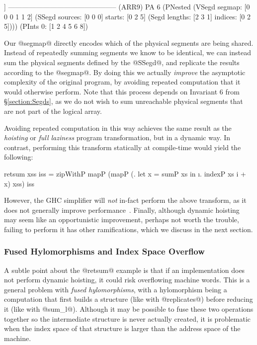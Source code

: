 \eject
\begin{small}
\begin{code}
      [[1 2] [1 2] [1 2] [4 5 6] [4 5 6] [8]]
 ----------------------------------------------- (ARR9)
   PA 6 (PNested 
    (VSegd  segmap: [0 0 0 1 1 2]
    (SSegd sources: [0 0 0]    starts: [0 2 5]
    (Segd  lengths: [2 3 1]   indices: [0 2 5])))
    (PInts 0: [1 2 4 5 6 8])
\end{code}
\end{small}

Our @segmap@ directly encodes which of the physical segments are being shared. Instead of repeatedly summing segments we know to be identical, we can instead sum the physical segments defined by the @SSegd@, and replicate the results according to the @segmap@. By doing this we actually \emph{improve} the asymptotic complexity of the original program, by avoiding repeated computation that it would otherwise perform. Note that this process depends on Invariant 6 from \S\ref{section:Segds}, as we do not wish to sum unreachable physical segments that are not part of the logical array.

Avoiding repeated computation in this way achieves the same result as the \emph{hoisting} or \emph{full laziness} program transformation, but in a dynamic way. In contrast, performing this transform statically at compile-time would yield the following: 
%
\begin{small}
\begin{code}
 retsum xss iss 
   = zipWithP mapP
             (mapP (\xs. let x = sumP xs 
                         in \i. indexP xs i + x) xss) iss
\end{code}
\end{small}
%
However, the GHC simplifier will \emph{not} in-fact perform the above transform, as it does not generally improve performance~\cite{PeytonJones:let-floating}. Finally, although dynamic hoisting may seem like an opportunistic improvement, perhaps not worth the trouble, failing to perform it has other ramifications, which we discuss in the next section.


\subsubsection{Fused Hylomorphisms and Index Space Overflow}
\label{section:IndexSpaceOverflow}
A subtle point about the @retsum@ example is that if an implementation does not perform dynamic hoisting, it could risk overflowing machine words. This is a general problem with \emph{fused hylomorphisms}, with a hylomorphism being a computation that first builds a structure (like with @replicates@) before reducing it (like with @sum_l@). Although it may be possible to fuse these two operations together so the intermediate structure is never actually created, it is problematic when the index space of that structure is larger than the address space of the machine.

